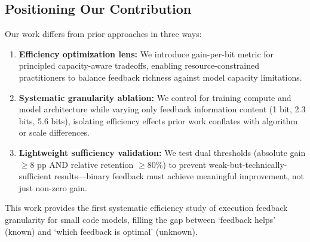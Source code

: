 \subsection{Positioning Our Contribution}

Our work differs from prior approaches in three ways:

\begin{enumerate}
\item \textbf{Efficiency optimization lens:} We introduce gain-per-bit metric for principled capacity-aware tradeoffs, enabling resource-constrained practitioners to balance feedback richness against model capacity limitations.

\item \textbf{Systematic granularity ablation:} We control for training compute and model architecture while varying only feedback information content (1 bit, 2.3 bits, 5.6 bits), isolating efficiency effects prior work conflates with algorithm or scale differences.

\item \textbf{Lightweight sufficiency validation:} We test dual thresholds (absolute gain $\geq$8 pp AND relative retention $\geq$80\%) to prevent weak-but-technically-sufficient results---binary feedback must achieve meaningful improvement, not just non-zero gain.
\end{enumerate}

This work provides the first systematic efficiency study of execution feedback granularity for small code models, filling the gap between `feedback helps' (known) and `which feedback is optimal' (unknown).
